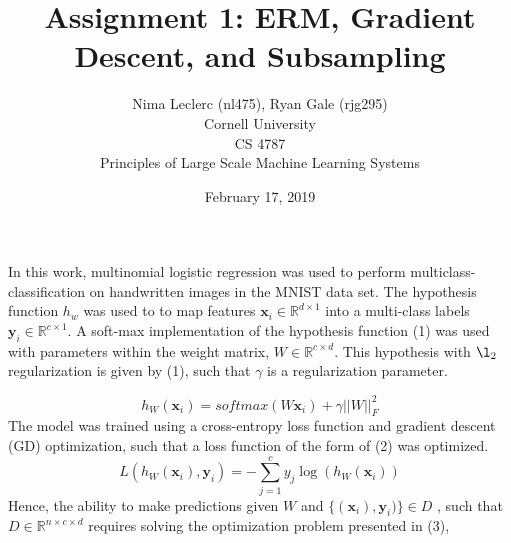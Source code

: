 \documentclass{article}
\begin{document}
 
\title{\bf{Assignment 1:  ERM, Gradient Descent, and Subsampling }}
\author{Nima Leclerc (nl475), Ryan Gale (rjg295) \\Cornell University\\CS 4787 \\ Principles of Large Scale Machine Learning Systems}
\date{February 17, 2019} 
\maketitle
In this work, multinomial logistic regression was used to perform multiclass-classification on handwritten images in the MNIST data set. The hypothesis function $h_{w}$ was used to to map features $\mathbf{x}_{i} \in  \mathbb{R}^{d \times 1}$ into a multi-class labels $\mathbf{y}_{i} \in  \mathbb{R}^{c \times 1}$. A soft-max implementation of the hypothesis function (1) was used with parameters within the weight matrix, $W  \in  \mathbb{R}^{c \times d}$. This hypothesis with $\l_{2}$ regularization is given by (1), such that $\gamma$ is a regularization parameter. 
 
\begin{equation}
h_{W} (\mathbf{x}_{i} ) = softmax(W\mathbf{x}_{i} ) + \gamma ||W||_{F}^{2}
\end{equation}
The model was trained using a cross-entropy loss function and gradient descent (GD) optimization, such that a loss function of the form of (2) was optimized. 
\begin{equation}
L(h_{W} (\mathbf{x}_{i} ),\mathbf{y}_{i}) =-\sum_{j=1}^{c} y_{j} \log (h_{W} (\mathbf{x}_{i} ) )
\end{equation}
Hence, the ability to make predictions given $W$ and $\{( \mathbf{x}_{i} ),\mathbf{y}_{i}) \} \in D$ , such that $D \in   \mathbb{R}^{n \times c \times d}$ requires solving the optimization problem presented in (3), 
    
\end{document}
